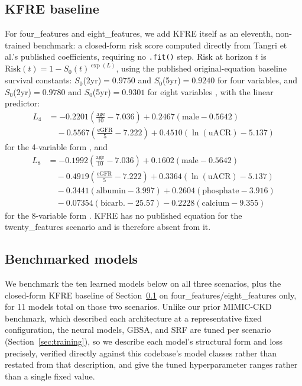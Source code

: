 \subsection{KFRE baseline} \label{sec:kfre}
For four\_features and eight\_features, we add KFRE itself as an eleventh, non-trained benchmark: a closed-form risk score computed directly from Tangri et al.'s published coefficients, requiring no \texttt{.fit()} step. Risk at horizon $t$ is $\mathrm{Risk}(t) = 1 - S_0(t)^{\exp(L)}$, using the published original-equation baseline survival constants: $S_0$(2yr)$=0.9750$ and $S_0$(5yr)$=0.9240$ for four variables, and $S_0$(2yr)$=0.9780$ and $S_0$(5yr)$=0.9301$ for eight variables \citep{tangri2016multinational}, with the linear predictor:
\begin{align}
L_4 &= -0.2201\left(\tfrac{\text{age}}{10}-7.036\right) + 0.2467(\text{male}-0.5642) \nonumber\\
&\quad -0.5567\left(\tfrac{\text{eGFR}}{5}-7.222\right) + 0.4510\left(\ln(\text{uACR})-5.137\right)
\end{align}
for the 4-variable form \citep{tangri2011predicting}, and
\begin{align}
L_8 &= -0.1992\left(\tfrac{\text{age}}{10}-7.036\right) + 0.1602(\text{male}-0.5642) \nonumber \\
&\quad -0.4919\left(\tfrac{\text{eGFR}}{5}-7.222\right) + 0.3364\left(\ln(\text{uACR})-5.137\right) \nonumber \\
&\quad -0.3441(\text{albumin}-3.997) + 0.2604(\text{phosphate}-3.916) \nonumber \\
&\quad -0.07354(\text{bicarb.}-25.57) -0.2228(\text{calcium}-9.355)
\end{align}
for the 8-variable form \citep{tangri2011predicting}. KFRE has no published equation for the twenty\_features scenario and is therefore absent from it.

\subsection{Benchmarked models} \label{sec:models}
We benchmark the ten learned models below on all three scenarios, plus the closed-form KFRE baseline of Section~\ref{sec:kfre} on four\_features/eight\_features only, for 11 models total on those two scenarios. Unlike our prior MIMIC-CKD benchmark, which described each architecture at a representative fixed configuration, the neural models, GBSA, and SRF are tuned per scenario (Section~\ref{sec:training}), so we describe each model's structural form and loss precisely, verified directly against this codebase's model classes rather than restated from that description, and give the tuned hyperparameter ranges rather than a single fixed value.


